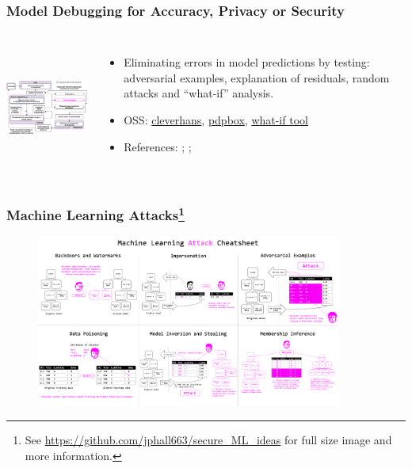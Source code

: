 \documentclass[11pt,
               aspectratio=169,
               hyperref={colorlinks}
               ]{beamer}
\begin{document}
			\begin{frame}
		
				\frametitle{Model Debugging for Accuracy, Privacy or Security}		
			
				\begin{columns}
	
					\centering
					\includegraphics[height=120pt]{../img/md.png}
				
					\vspace{-5pt}
					\scriptsize
					{\begin{itemize}
						\item Eliminating errors in model predictions by testing: adversarial examples, explanation of residuals, random attacks and ``what-if'' analysis.
						\item OSS: \href{https://github.com/tensorflow/cleverhans}{cleverhans}, \href{https://github.com/SauceCat/PDPbox}{pdpbox}, \href{https://pair-code.github.io/what-if-tool/index.html}{what-if tool}
						\item References: ; ; 
					\end{itemize}}
					\normalsize
				
				\end{columns}			
			
			\end{frame}
			
			\begin{frame}	
			
				\frametitle{Machine Learning Attacks\footnote{\tiny{See \url{https://github.com/jphall663/secure_ML_ideas} for full size image and more information.}}}		
			
				\begin{figure}[htb]
					\begin{center}
						\includegraphics[height=160pt]{../img/cheatsheet.png}
					\end{center}
				\end{figure}	
			\end{frame}
			
\end{document}
